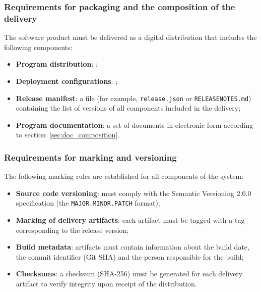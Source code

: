 \documentclass[12pt,a4paper]{extarticle}
\begin{document}
\subsubsection{Requirements for packaging and the composition of the delivery}

\begin{hseExample}
The software product must be delivered as a digital distribution that includes the following components:
\begin{itemize}[nosep, leftmargin=1.25cm]
    \item \textbf{Program distribution}: ;
    \item \textbf{Deployment configurations}: ;
    \item \textbf{Release manifest}: a file (for example, \texttt{release.json} or \texttt{RELEASENOTES.md}) containing the list of versions of all components included in the delivery;
    \item \textbf{Program documentation}: a set of documents in electronic form according to section~\ref{sec:doc_composition}.
\end{itemize}
\end{hseExample}

\subsubsection{Requirements for marking and versioning}

\begin{hseExample}
The following marking rules are established for all components of the system:
\begin{itemize}[nosep, leftmargin=1.25cm]
    \item \textbf{Source code versioning}: must comply with the Semantic Versioning 2.0.0 specification (the \texttt{MAJOR.MINOR.PATCH} format);
    \item \textbf{Marking of delivery artifacts}: each artifact must be tagged with a tag corresponding to the release version;
    \item \textbf{Build metadata}: artifacts must contain information about the build date, the commit identifier (Git SHA) and the person responsible for the build;
    \item \textbf{Checksums}: a checksum (SHA-256) must be generated for each delivery artifact to verify integrity upon receipt of the distribution.
\end{itemize}
\end{hseExample}
\end{document}
